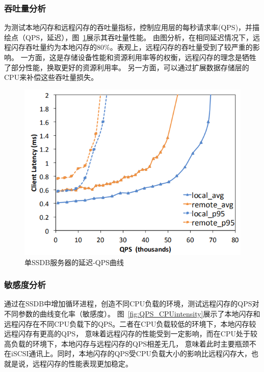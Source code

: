\subsubsection{吞吐量分析}
为测试本地闪存和远程闪存的吞吐量指标，控制应用层的每秒请求率(QPS)，并描绘点（QPS，延迟），图~\ref{fig:QPS_latency}展示其吞吐量性能。
由图分析，在相同延迟情况下，远程闪存吞吐量约为本地闪存的80\%。表观上，远程闪存的吞吐量受到了较严重的影响。
一方面，这是存储设备性能和资源利用率等的权衡，远程闪存的理念是牺牲了部分性能，换取更好的资源利用率。
另一方面，可以通过扩展数据存储层的CPU来补偿这些吞吐量损失。

\begin{figure}
\centering
\includegraphics[scale=0.8]{Figures/storage/QPS_latency.jpg}
\decoRule
\caption{单SSDB服务器的延迟-QPS曲线}
\label{fig:QPS_latency}
\end{figure}

\subsubsection{敏感度分析}
通过在SSDB中增加循环进程，创造不同CPU负载的环境，测试远程闪存的QPS对不同参数的曲线变化率（敏感度）。
图~\ref{fig:QPS_CPUintensity}展示了本地闪存和远程闪存在不同CPU负载下的QPS。二者在CPU负载较低的环境下，本地闪存较远程闪存有更高的QPS，
意味着远程闪存的性能受到一定影响，而在CPU处于较高负载的环境下，本地闪存与远程闪存的QPS相差无几，
意味着此时主要瓶颈不在iSCSI通讯上。同时，本地闪存的QPS受CPU负载大小的影响比远程闪存大，也就是说，远程闪存的性能表现更加稳定。



